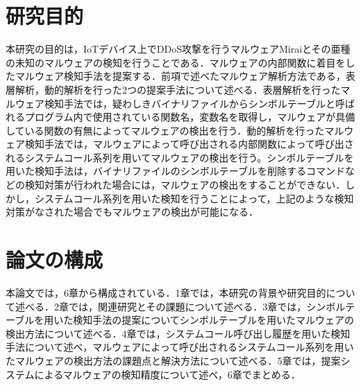 \section{研究目的}
本研究の目的は，IoTデバイス上でDDoS攻撃を行うマルウェアMiraiとその亜種の未知のマルウェアの検知を行うことである．マルウェアの内部関数に着目をしたマルウェア検知手法を提案する．前項で述べたマルウェア解析方法である，表層解析，動的解析を行った2つの提案手法について述べる．表層解析を行ったマルウェア検知手法では，疑わしきバイナリファイルからシンボルテーブルと呼ばれるプログラム内で使用されている関数名，変数名を取得し，マルウェアが具備している関数の有無によってマルウェアの検出を行う．動的解析を行ったマルウェア検知手法では，マルウェアによって呼び出される内部関数によって呼び出されるシステムコール系列を用いてマルウェアの検出を行う。シンボルテーブルを用いた検知手法は，バイナリファイルのシンボルテーブルを削除するコマンドなどの検知対策が行われた場合には，マルウェアの検出をすることができない．しかし，システムコール系列を用いた検知を行うことによって，上記のような検知対策がなされた場合でもマルウェアの検出が可能になる．
　
\section{論文の構成}
本論文では，6章から構成されている．1章では，本研究の背景や研究目的について述べる．2章では，関連研究とその課題について述べる．3章では，シンボルテーブルを用いた検知手法の提案についてシンボルテーブルを用いたマルウェアの検出方法について述べる．4章では，システムコール呼び出し履歴を用いた検知手法について述べ，マルウェアによって呼び出されるシステムコール系列を用いたマルウェアの検出方法の課題点と解決方法について述べる．5章では，提案システムによるマルウェアの検知精度について述べ，6章でまとめる．%